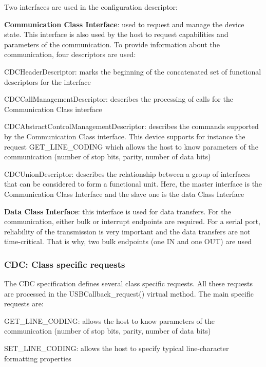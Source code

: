 \documentclass[pdftex,10pt,a4paper]{report}
\newenvironment{packed_item}{
\begin{itemize}
  \setlength{\itemsep}{1pt}
  \setlength{\parskip}{0pt}
  \setlength{\parsep}{0pt}
}{\end{itemize}}
\begin{document}
Two interfaces are used in the configuration descriptor:
\begin{packed_item}
	\item \textbf{Communication Class Interface}: used to request and manage the device state. This interface is also used by the host to request capabilities and parameters of the communication. To provide information about the communication, four descriptors are used:
	\begin{packed_item}
		\item CDCHeaderDescriptor: marks the beginning of the concatenated set of functional descriptors for the interface
		\item CDCCallManagementDescriptor: describes the processing of calls for the Communication Class interface
 		\item CDCAbstractControlManagementDescriptor: describes the commands supported by the Communication Class interface. This device supports for instance the request GET\_LINE\_CODING which allows the host to know parameters of the communication (number of stop bits, parity, number of data bits)
		\item CDCUnionDescriptor: describes the relationship between a group of interfaces that can be considered to form
a functional unit. Here, the master interface is the Communication Class Interface and the slave one is the data Class Interface
	\end{packed_item}
	\item \textbf{Data Class Interface}: this interface is used for data transfers. For the communication, either bulk or interrupt endpoints are required. For a serial port,  reliability
of the transmission is very important and the data transfers are not time-critical. That is why, two bulk endpoints (one IN and one OUT) are used
\end{packed_item}


\subsubsection{CDC: Class specific requests}
The CDC specification defines several class specific requests. All these requests are processed in the USBCallback\_request() virtual method. The main specific requests are:
\begin{packed_item}
	\item GET\_LINE\_CODING: allows the host to know parameters of the communication (number of stop bits, parity, number of data bits)
	\item SET\_LINE\_CODING: allows the host to specify typical line-character formatting properties
\end{packed_item}
\end{document}
